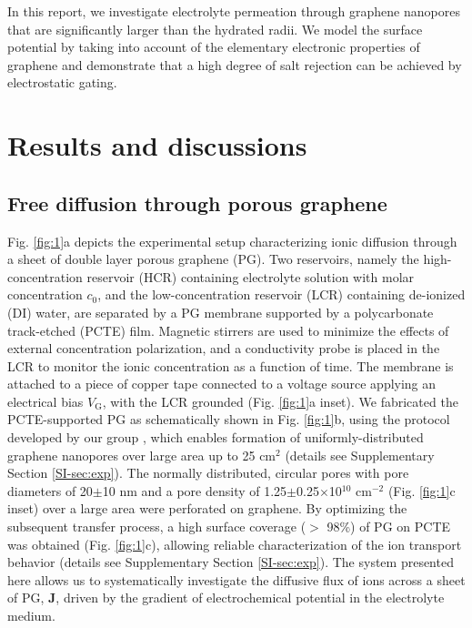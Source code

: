 \documentclass[journal=nalefd,email=true, hyperref=true, keywords=false]{achemso}
\newcommand{\Fig}{Fig.}
\begin{document}
In this report, we
investigate electrolyte permeation through graphene nanopores that are
significantly larger than the hydrated radii. We model the surface
potential by taking into account of the elementary electronic
properties of graphene and demonstrate that a high degree of salt
rejection can be achieved by electrostatic gating.

\section{Results and discussions}
\label{sec:res}

\subsection{Free diffusion through porous graphene}
\label{sec:res-1}

\Fig{} \ref{fig:1}a depicts the experimental setup characterizing
ionic diffusion through a sheet of double layer porous graphene
(PG). Two reservoirs, namely the high-concentration reservoir (HCR)
containing electrolyte solution with molar concentration $c_0$, and
the low-concentration reservoir (LCR) containing de-ionized (DI)
water, are separated by a PG membrane supported by a polycarbonate
track-etched (PCTE) film. Magnetic stirrers are used to minimize the
effects of external concentration polarization, and a conductivity
probe is placed in the LCR to monitor the ionic concentration as a
function of time. The membrane is attached to a piece of copper tape
connected to a voltage source applying an electrical bias
$V_{\mathrm{G}}$, with the LCR grounded (\Fig{} \ref{fig:1}a
inset). We fabricated the PCTE-supported PG as schematically shown in
\Fig{} \ref{fig:1}b, using the protocol developed by our group
\cite{Choi_2018}, which enables formation of uniformly-distributed
graphene nanopores over large area up to 25 cm$^{2}$ (details see
Supplementary Section \ref{SI-sec:exp}). The normally distributed,
circular pores with pore diameters of 20$\pm$10 nm and a pore density
of 1.25$\pm$0.25$\times$10$^{10}$ cm$^{-2}$ (\Fig{} \ref{fig:1}c
inset) over a large area were perforated on graphene.  By optimizing
the subsequent transfer process, a high surface coverage ($>$ 98\%) of
PG on PCTE was obtained (\Fig{} \ref{fig:1}c), allowing reliable
characterization of the ion transport behavior (details see
Supplementary Section \ref{SI-sec:exp}).  The system presented here
allows us to systematically investigate the diffusive flux of ions
across a sheet of PG, $\boldsymbol{J}$, driven by the gradient of
electrochemical potential in the electrolyte medium.
\end{document}
